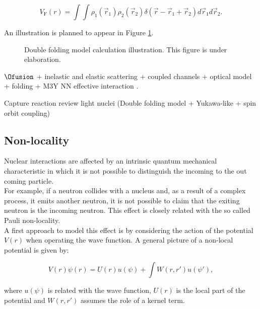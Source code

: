 \documentclass[openany]{book}
\begin{document}
\begin{equation} \label{eq:potential_SaoPaulo_folding}
	V_{\mathrm{F}}(r) = \int \int \rho_1(\vec r_1)  \rho_2(\vec r_2) \delta(\vec r - \vec r_1 +  \vec r_2) {d\vec{r}_1}  {d\vec{r}_2}.
\end{equation}

An illustration is planned to appear in Figure \ref{fig:DoubleFolding}.

\begin{figure}[H]
	
	\caption[Double folding model calculation illustration]{Double folding model calculation illustration. This figure is under elaboration.}
	\label{fig:DoubleFolding}
\end{figure}

$\Ofusion$ + inelastic and elastic scattering + coupled channels + optical model + folding + M3Y NN effective interaction \cite{hassanain_al_sebiey_2014}.  

Capture reaction review light nuclei (Double folding model + Yukawa-like + spin orbit coupling)\cite{ghasemi_sadeghi_2018}

\subsection{Non-locality}  \label{sub:potential_nonlocality}

Nuclear interactions are affected by an intrinsic quantum mechanical characteristic in which it is not possible to distinguish the incoming to the out coming particle. \\

For example, if a neutron collides with a nucleus and, as a result of a complex process, it emits another neutron, it is not possible to claim that the exiting neutron is the incoming neutron.  This effect is closely related with the so called Pauli non-locality. \\

A first approach to model this effect is by considering the action of the potential $V(r)$ when operating the wave function. A general picture of a non-local potential is given by:

\begin{equation} \label{eq:nonLocality_picture}
	V(r) \psi(r) = U(r) u(\psi) + \int W(r, r') u(\psi'),
\end{equation}

where $u(\psi)$ is related with the wave function, $U(r)$ is the local part of the potential and $W(r, r')$ assumes the role of a kernel term. \\
\end{document}
